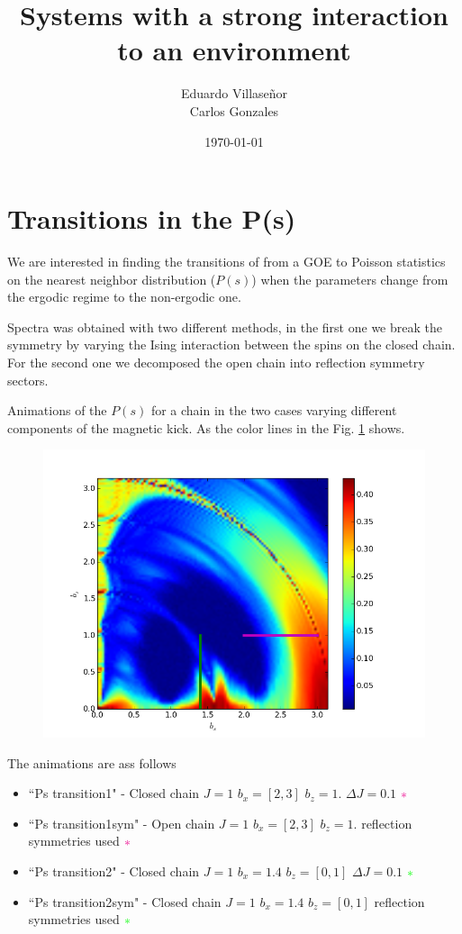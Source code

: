 \documentclass[floatfix]{article}
\title{Systems with a strong interaction to an environment}
\author{Eduardo Villase\~nor \\ Carlos Gonzales}
\date{\today}
\newcommand*{\gd}{
\textcolor{green}{\ast}}
\newcommand*{\md}{
\textcolor{magenta}{\ast}}
\newcommand*{\ud}{
\underline{\space\space}}
\begin{document}
\maketitle



\section{Transitions in the P(s)}

We are interested in finding the transitions of from a GOE to Poisson statistics on the
nearest neighbor distribution ($P(s)$) when the parameters change from the ergodic regime to the non-ergodic 
one.

Spectra was obtained with two different methods, in the first one we break the symmetry by varying the Ising interaction between the
spins on the closed chain. For the second one we decomposed the open chain into reflection symmetry sectors.

Animations of the $P(s)$ for a chain in the two cases varying different components of the magnetic kick. As
the color lines in the Fig. \ref{anim_gui} shows.

\begin{figure}[H]
\begin{center}
\includegraphics[width=.5\columnwidth]{anim_guide}  
\end{center}
\caption{}
\label{anim_gui}
\end{figure}

The animations are ass follows 
\begin{itemize}
\item ``Ps\ud transition1" - Closed chain $J=1$ $b_x=[2,3]$ $b_z=1.$ $\Delta J = 0.1$ $\md$
\item ``Ps\ud transition1\underline{\space\space}sym" - Open chain $J=1$ $b_x=[2,3]$ $b_z=1.$ reflection symmetries used $\md$
\item ``Ps\ud transition2" - Closed chain $J=1$ $b_x=1.4$ $b_z=[0,1]$ $\Delta J = 0.1$ $\gd$
\item ``Ps\ud transition2\underline{\space\space}sym" - Closed chain $J=1$ $b_x=1.4$ $b_z=[0,1]$ reflection symmetries used $\gd$
\end{itemize}
\end{document}
